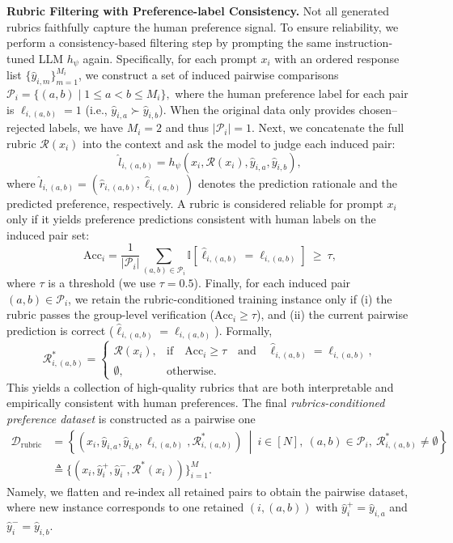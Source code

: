 \noindent \textbf{Rubric Filtering with Preference-label Consistency.}
Not all generated rubrics faithfully capture the human preference signal.
To ensure reliability, we perform a consistency-based filtering step by prompting the same instruction-tuned LLM $h_\psi$ again.
Specifically, for each prompt $x_i$ with an ordered response list $\{\hat{y}_{i,m}\}_{m=1}^{M_i}$, we construct a set of induced pairwise comparisons
$
\mathcal{P}_i=\{(a,b)\mid 1\le a<b\le M_i\},
$
where the human preference label for each pair is $\ell_{i,(a,b)}=1$ (i.e., $\hat{y}_{i,a}\succ \hat{y}_{i,b}$).
When the original data only provides chosen--rejected labels, we have $M_i=2$ and thus $|\mathcal{P}_i|=1$.
Next, we concatenate the full rubric $\mathcal{R}(x_i)$ into the context and ask the model to judge each induced pair:
\begin{equation}
\hat{l}_{i,(a,b)} = h_\psi\!\left(x_i, \mathcal{R}(x_i), \hat{y}_{i,a}, \hat{y}_{i,b}\right),
\end{equation}
where $\hat{l}_{i,(a,b)}=(\hat{r}_{i,(a,b)}, \hat{\ell}_{i,(a,b)})$ denotes the prediction rationale and the predicted preference, respectively.
A rubric is considered reliable for prompt $x_i$ only if it yields preference predictions consistent with human labels on the induced pair set:
\begin{equation}
\mathrm{Acc}_i
=
\frac{1}{|\mathcal{P}_i|}
\sum_{(a,b)\in\mathcal{P}_i}
\mathbb{I}\!\left[\hat{\ell}_{i,(a,b)}=\ell_{i,(a,b)}\right]
\ \ge\ \tau,
\end{equation}
where $\tau$ is a threshold (we use $\tau=0.5$).
% 
Finally, for each induced pair $(a,b)\in\mathcal{P}_i$, we retain the rubric-conditioned training instance only if
(i) the rubric passes the group-level verification ($\mathrm{Acc}_i\ge\tau$), and
(ii) the current pairwise prediction is correct ($\hat{\ell}_{i,(a,b)}=\ell_{i,(a,b)}$).
Formally,
\begin{equation}
\mathcal{R}^*_{i,(a,b)} =
\begin{cases}
\mathcal{R}(x_i), & \text{if} \quad \mathrm{Acc}_i \ge \tau \quad \text{and} \quad \hat{\ell}_{i,(a,b)}=\ell_{i,(a,b)},\\
\emptyset, & \text{otherwise.}
\end{cases}
\end{equation}
This yields a collection of high-quality rubrics that are both interpretable and empirically consistent with human preferences.
The final \emph{rubrics-conditioned preference dataset} is constructed as a pairwise one
\begin{align}
\mathcal{D}_{\text{rubric}}
&=
\left\{
\left(x_i, \hat{y}_{i,a}, \hat{y}_{i,b}, \ell_{i,(a,b)}, \mathcal{R}^*_{i,(a,b)}\right)
\ \middle|\ 
i\in[N],\ (a,b)\in\mathcal{P}_i,\ \mathcal{R}^*_{i,(a,b)}\neq\emptyset
\right\} \\
&\triangleq
\{(x_i,\hat{y}_i^+,\hat{y}_i^-,\mathcal{R}^*(x_i))\}_{i=1}^M.
\end{align}
Namely, we flatten and re-index all retained pairs to obtain the pairwise dataset,
where new instance corresponds to one retained $(i,(a,b))$ with $\hat{y}_i^+=\hat{y}_{i,a}$ and $\hat{y}_i^-=\hat{y}_{i,b}$.




